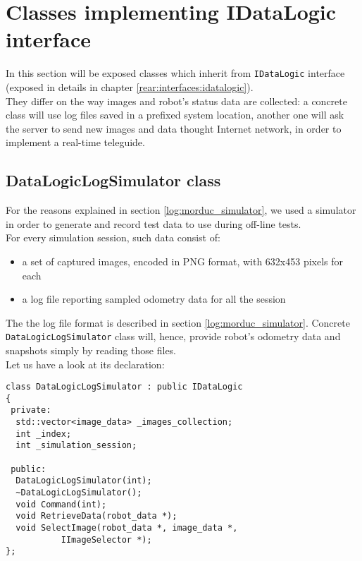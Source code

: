 \section{Classes implementing IDataLogic interface}
\label{concr:idatalogic}

In this section will be exposed classes which inherit
from \texttt{IDataLogic} interface (exposed in details
in chapter \ref{rear:interfaces:idatalogic}).
\\
They differ on the way images
and robot's status data are collected: a concrete class
will use log files saved in a prefixed system location,
another one will ask the server to send new images and data
thought Internet network, in order to implement a real-time
teleguide.

\subsection{DataLogicLogSimulator class}
\label{concr:idatalogic:datalogiclogsimulator}

For the reasons explained in section \ref{log:morduc_simulator},
we used a \morduc{} simulator in order to generate and record 
test data to use during off-line tests.
\\
For every simulation session, such data consist of:

\begin{itemize}
  \item a set of captured images, encoded in PNG format,
    with 632x453 pixels for each
  \item a log file reporting sampled odometry data
    for all the session
\end{itemize}

The the log file format is described in section 
\ref{log:morduc_simulator}.
Concrete \texttt{DataLogicLogSimulator} class will, hence, provide 
robot's odometry data and snapshots simply by reading 
those files.
\\
Let us have a look at its declaration:
\\
\begin{lstlisting}[caption={\texttt{DataLogicLogSimulator} declaration},
    label={code:datalogiclogsimulator:declaration}]
class DataLogicLogSimulator : public IDataLogic
{
 private:
  std::vector<image_data> _images_collection;
  int _index;
  int _simulation_session;
  
 public:
  DataLogicLogSimulator(int);
  ~DataLogicLogSimulator();
  void Command(int);
  void RetrieveData(robot_data *);
  void SelectImage(robot_data *, image_data *,
		   IImageSelector *);
};
\end{lstlisting}

